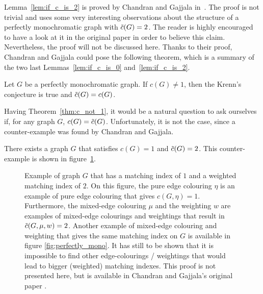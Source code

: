 Lemma~\ref{lem:if_c_is_2} is proved by Chandran and Gajjala in~\cite{chandran}.
The proof is not trivial and uses some very interesting observations about the structure of a perfectly monochromatic graph with $\Tilde{c}(G) = 2$.
The reader is highly encouraged to have a look at it in the original paper in order to believe this claim.
Nevertheless, the proof will not be discussed here.
Thanks to their proof, Chandran and Gajjala could pose the following theorem, which is a summary of the two last Lemmas~\ref{lem:if_c_is_0} and~\ref{lem:if_c_is_2}.

\begin{theorem}
    \label{thm:c_not_1}
    Let $G$ be a perfectly monochromatic graph.
    If $c(G) \neq 1$, then the Krenn's conjecture is true and $\Tilde{c}(G) = c(G)$.
\end{theorem}

Having Theorem~\ref{thm:c_not_1}, it would be a natural question to ask ourselves if, for any graph $G$, $c(G) = \Tilde{c}(G)$.
Unfortunately, it is not the case, since a counter-example was found by Chandran and Gajjala. \cite{chandran}

\begin{observation}
    \label{obs:c_not_c_tilde}
    There exists a graph $G$ that satisfies $c(G) = 1$ and $\Tilde{c}(G) = 2$.
    This counter-example is shown in figure~\ref{fig:proof_c_not_c_tilde}.
\end{observation}

\begin{figure}[H]       %
    \caption{Example of graph $G$ that has a matching index of $1$ and a weighted matching index of $2$.        %
        On this figure, the pure edge colouring $\eta$ is an example of pure edge colouring that gives $c(G, \eta) = 1$.
        Furthermore, the mixed-edge colouring $\mu$ and the weighting $w$ are examples of mixed-edge colourings and weightings that result in $\Tilde{c}(G, \mu, w) = 2$.
        Another example of mixed-edge colouring and weighting that gives the same matching index on $G$ is available in figure \ref{fig:perfectly_mono}.   %
        It has still to be shown that it is impossible to find other edge-colourings / weightings that would lead to bigger (weighted) matching indexes.
        This proof is not presented here, but is available in Chandran and Gajjala's original paper \cite{chandran}.}
    \label{fig:proof_c_not_c_tilde}
\end{figure}


